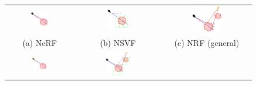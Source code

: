 \begin{figure}[!htbp]
    \setlength\tabcolsep{4pt}
    \begin{tabular}{ccc}
          \includegraphics[width=0.284\textwidth]{figures/sampling_nerf.png}
          & \includegraphics[width=0.261\textwidth]{figures/sampling_nsvf.png}
          & \includegraphics[width=0.35\textwidth]{figures/sampling_nrf.png}
          \\(a) NeRF \cite{mildenhall2020nerf} & (b) NSVF \cite{liu2021neural} & (c) NRF \cite{bi2020neural} (general)
          \\[6pt]\includegraphics[width=0.25\textwidth]{figures/sampling_nrf_colocated.png}
          & \includegraphics[width=0.315\textwidth]{figures/sampling_bfex.png}

\end{tabular}
\end{figure}
